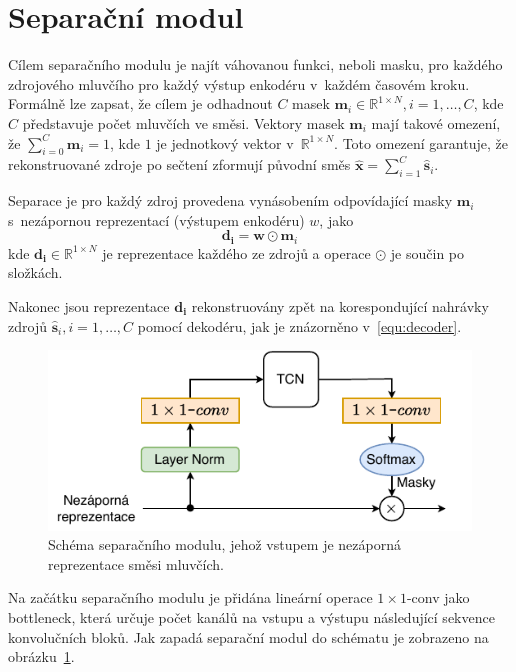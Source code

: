
\section{Separační modul}
Cílem separačního modulu je najít váhovanou funkci, neboli masku, pro každého zdrojového mluvčího pro každý výstup enkodéru v~každém časovém kroku. Formálně lze zapsat, že cílem je odhadnout $C$ masek $\boldsymbol{m}_i \in \mathbb{R}^{1 \times N}, i = 1, \dots, C$, kde $C$ představuje počet mluvčích ve směsi. Vektory masek $\boldsymbol{m}_i$ mají takové omezení, že $\sum_{i=0}^{C}\boldsymbol{m}_i=1$, kde $1$ je jednotkový vektor v~$\mathbb{R}^{1 \times N}$. Toto omezení garantuje, že rekonstruované zdroje po sečtení zformují původní směs $\boldsymbol{\hat{x}} = \sum_{i=1}^{C}\boldsymbol{\hat{s}}_i$.

Separace je pro každý zdroj provedena vynásobením odpovídající masky $\textbf{m}_i$ s~nezápornou reprezentací (výstupem enkodéru) $w$, jako
\begin{equation}
	\boldsymbol{d_i} = \boldsymbol{w} \odot \boldsymbol{m}_i
\end{equation}
kde $\boldsymbol{d_i} \in \mathbb{R}^{1 \times N}$ je reprezentace každého ze zdrojů a operace $\odot$ je součin po složkách. 

Nakonec jsou reprezentace $\boldsymbol{d_i}$ rekonstruovány zpět na korespondující nahrávky zdrojů $\boldsymbol{\hat{s}}_i, i = 1, \dots, C$ pomocí dekodéru, jak je znázorněno v~\ref{equ:decoder}.


\begin{figure}[H]
    \centering
    \includegraphics[scale=1.0]{obrazky-figures/separation_module_scheme.pdf}
    \caption{\label{fig:tasnet-separationmodule}Schéma separačního modulu, jehož vstupem je nezáporná reprezentace směsi mluvčích.}
\end{figure}


Na začátku separačního modulu je přidána lineární operace $1 \times 1$-conv jako bottleneck, která určuje počet kanálů na vstupu a výstupu následující sekvence konvolučních bloků. Jak zapadá separační modul do schématu je zobrazeno na obrázku~\ref{fig:tasnet-separationmodule}.

